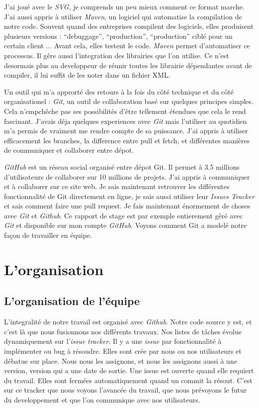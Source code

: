 J'ai joué avec le \textit{SVG}, je comprends un peu mieux comment ce format marche. J'ai aussi appris à utiliser \textit{Maven}, un logiciel qui automatise la compilation de notre code. Souvent quand des entreprises compilent des logiciels, elles produisent plusieurs versions : ``debuggage'', ``production'', ``production'' ciblé pour un certain client ... Avant cela, elles testent le code. \textit{Maven} permet d'automatiser ce processus. Il gêre aussi l'integration des librairies que l'on utilise. Ce n'est desormais plus au developpeur de réunir toutes les librairie dépendantes avant de compiler, il lui suffit de les noter dans un fichier XML.

Un outil qui m'a approrté des retours à la fois du côté technique et du côté organisationel : \textit{Git}, un outil de collaboration basé sur quelques principes simples. Cela n'empchêche pas ses possibilités d'être tellement étendues que cela le rend fascinant. J'avais déja quelques experiences avec \textit{Git} mais l'utiliser au quotidien m'a permis de vraiment me rendre compte de sa puissance. J'ai appris à utiliser efficacement les branches, la difference entre pull et fetch, et différentes manières de communiquer et collaborer entre dépot.

\textit{GitHub} est un réseau social organisé entre dépot Git. Il permet à 3.5 millions d'utilisateurs de collaborer sur 10 millions de projets. J'ai appris à communiquer et à collaborer sur ce site web. Je sais maintenant retrouver les différentes fonctionnalité de Git directement en ligne, je sais aussi utiliser leur \textit{Issues Tracker} et sais comment faire une pull request. Je fais maintenant énormement de choses avec \textit{Git} et \textit{Github}. Ce rapport de stage est par exemple entierement gêré avec \textit{Git} et disponible sur mon compte \textit{GitHub}.
Voyons comment Git a modelé notre façon de travailler en équipe.


\section{L'organisation}

\subsection{L'organisation de l'équipe}
L'integralité de notre travail est organisé avec \textit{Github}. Notre code source y est, et c'est là que nous fusionnons nos différents travaux. Nos listes de tâches évolue dynamiquement sur l'\textit{issue tracker}. Il y a une \textit{issue} par fonctionnalité à implémenter ou bug à résoudre. Elles sont crée par nous ou nos utilisateurs et débatue sur place. Nous nous les assignons, et nous les assignons aussi à une version, version qui a une date de sortie. Une issue est ouverte quand elle requiert du travail. Elles sont fermées automatiquement quand un commit la résout. C'est sur ce tracker que nous voyons l'avancée du travail, que nous prévoyons le futur du developpement et que l'on communique avec nos utilisateurs.

